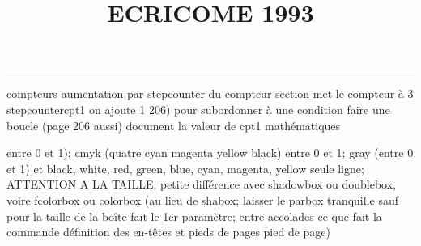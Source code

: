\documentclass[11pt]{article}%
\title{\bf \vspace{-2cm} ECRICOME 1993} %
\author{} %
\date{} %
\renewcommand{\headrulewidth}{0pt}%
\renewcommand{\footrulewidth}{0.4pt}%
\begin{document}
\maketitle %
\vspace{-1.4cm}\hrule %
\thispagestyle{fancy}

\vspace*{.2cm}



compteurs%
aumentation par stepcounter du compteur section%
met le compteur à 3%
stepcounter{cpt1} on ajoute 1%
206) pour subordonner à une condition %
faire une boucle (page 206 aussi) %
document la valeur de cpt1 
mathématiques\newcommand{\ch}{\operatorname{ch}} 
\newcommand{\sh}{\operatorname{sh}}
\renewcommand{\tanh}{\operatorname{th}}
\renewcommand{\sinh}{\operatorname{sh}}
\renewcommand{\cosh}{\operatorname{ch}}
\newcommand{\argsh}{\operatorname{argsh}}
\newcommand{\argch}{\operatorname{argch}}
\newcommand{\argth}{\operatorname{argth}}
\newcommand{\Id}{\operatorname{Id}}
\renewcommand{\leq}{\leq}
\renewcommand{\geq}{\geq }

\newcommand{\dlim}{\lim}
\newcommand{\dsum}{\sum}
\newcommand{\dint}{\int}
\newcommand{\dprod}{\prod}



entre 0 et 1); cmyk (quatre cyan magenta yellow black) entre 0 et 1;
gray (entre 0 et 1) et black, white, red, green, blue, cyan, magenta,
yellow%
seule ligne; ATTENTION A LA TAILLE; petite différence avec shadowbox ou
doublebox, voire fcolorbox ou colorbox (au lieu de shabox; laisser le
parbox tranquille sauf pour la taille de la boîte
\newcommand{\Tbox}[1]{\begin{center} \shabox{\parbox{0.6
\linewidth}{#1}} \end{center}} %
fait le 1er paramètre; entre accolades ce que fait la commande
définition des en-têtes et pieds de pages\pagestyle{fancy}
\chead{}
\rfoot[ \ \thepage]{\thepage}
\cfoot{}
\lfoot{}
\thispagestyle{fancy} %
pied de page)\renewcommand{\footrulewidth}{0.4pt}
\renewcommand{\headrulewidth}{0.4pt}
\end{document}
